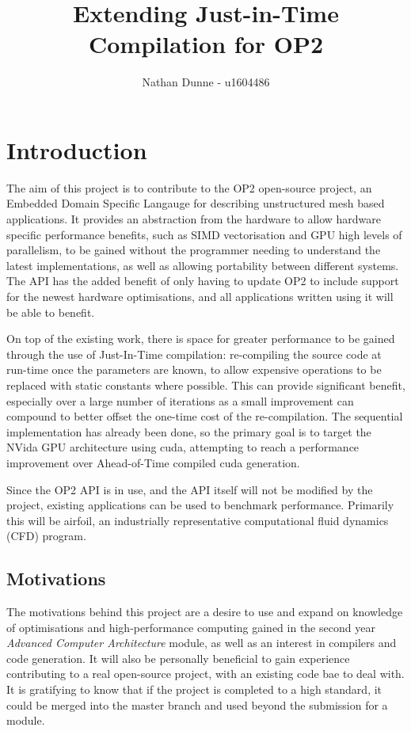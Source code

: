 \documentclass[11pt]{article}
\title{Extending Just-in-Time Compilation for OP2}
\author{Nathan Dunne - u1604486}
\begin{document}
\maketitle

\section*{Introduction}
The aim of this project is to contribute to the OP2 open-source project, an Embedded Domain Specific Langauge for describing unstructured mesh based applications. It provides an abstraction from the hardware to allow hardware specific performance benefits, such as SIMD vectorisation and GPU high levels of parallelism, to be gained without the programmer needing to understand the latest implementations, as well as allowing portability between different systems. The API has the added benefit of only having to update OP2 to include support for the newest hardware optimisations, and all applications written using it will be able to benefit.
\par On top of the existing work, there is space for greater performance to be gained through the use of Just-In-Time compilation: re-compiling the source code at run-time once the parameters are known, to allow expensive operations to be replaced with static constants where possible. This can provide significant benefit, especially over a large number of iterations as a small improvement can compound to better offset the one-time cost of the re-compilation. The sequential implementation has already been done, so the primary goal is to target the NVida GPU architecture using cuda, attempting to reach a performance improvement over Ahead-of-Time compiled cuda generation.
\par Since the OP2 API is in use, and the API itself will not be modified by the project, existing applications can be used to benchmark performance. Primarily this will be airfoil, an industrially representative computational fluid dynamics (CFD) program.
\subsection*{Motivations}
The motivations behind this project are a desire to use and expand on knowledge of optimisations and high-performance computing gained in the second year \textit{Advanced Computer Architecture} module, as well as an interest in compilers and code generation. It will also be personally beneficial to gain experience contributing to a real open-source project, with an existing code bae to deal with. It is gratifying to know that if the project is completed to a high standard, it could be merged into the master branch and used beyond the submission for a module.
\end{document}
